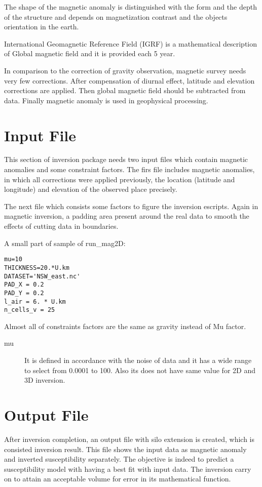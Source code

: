 The shape of the magnetic anomaly is distinguished with the form and the depth of the structure and depends on magnetization contrast and the objects orientation in the earth.

International Geomagnetic Reference Field (IGRF) is a mathematical description of Global magnetic field and it  is provided each 5 year.

In comparison to the correction of gravity observation, magnetic survey needs very few corrections. After compensation of diurnal effect, latitude and elevation corrections are applied. Then global magnetic field should be subtracted from data. Finally magnetic anomaly is used in geophysical processing.



\section{Input File} 
This section of inversion package needs two input files which contain magnetic anomalies and some constraint factors. The firs file includes magnetic anomalies, in which all corrections were applied previously, the location (latitude and longitude) and elevation of the observed place precisely.

The next file which consists some factors to figure the inversion escripts. Again in magnetic inversion, a padding area present around the real data to smooth the effects of cutting data in boundaries.
 
A small part of sample of run_mag2D:

\begin{verbatim}
mu=10
THICKNESS=20.*U.km
DATASET='NSW_east.nc'
PAD_X = 0.2
PAD_Y = 0.2
l_air = 6. * U.km
n_cells_v = 25
\end{verbatim}

Almost all of constraints factors are the same as gravity instead of Mu factor.\\

\begin{description} 	

\item[mu]
It is defined in accordance with the noise of data and it has a wide range to select from 0.0001 to 100. Also its does not have same value for 2D and 3D inversion.

\end{description}

\section{Output File}
After inversion completion, an output file with silo extension is created, which is consisted inversion result. This file shows the input data as magnetic anomaly and inverted susceptibility separately. The objective is indeed to  predict a susceptibility model with having a best fit with input data. The inversion carry on to attain an acceptable volume for error in its mathematical function. 





